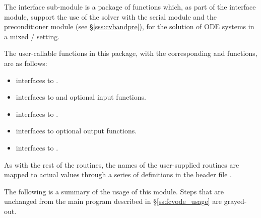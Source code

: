 The {\fcvbp} interface sub-module is a package of {\C} functions which,
as part of the {\fcvode} interface module, support the use of the
{\cvode} solver with the serial {\nvecs} module and the {\cvbandpre} 
preconditioner module (see \S\ref{sss:cvbandpre}), for the solution of 
ODE systems in a mixed {\F}/{\C} setting.  

The user-callable functions in this package, with the corresponding
{\cvode} and {\cvbandpre} functions, are as follows: 
\begin{itemize}
\item {}
  interfaces to .
\item {}
  interfaces to  and {\spgmr} optional input functions.
\item {}
  interfaces to .
\item {}
  interfaces to {\cvbandpre} optional output functions.
\item {}
  interfaces to .
\end{itemize}

As with the rest of the {\fcvode} routines, the names of the user-supplied
routines are mapped to actual values through a series of definitions in the
header file .

The following is a summary of the usage of this module. Steps that are unchanged
from the main program described in \S\ref{ss:fcvode_usage} are grayed-out.

